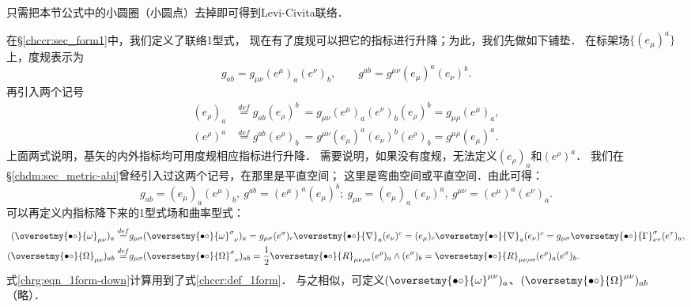只需把本节公式中的小圆圈（小圆点）去掉即可得到Levi-Civita联络．



在\S\ref{chccr:sec_form1}中，我们定义了联络1型式，
现在有了度规可以把它的指标进行升降；为此，我们先做如下铺垫．
在标架场$\{(e_\mu)^a\}$上，度规表示为
\begin{equation}
	g_{ab}=g_{\mu\nu}(e^\mu)_a (e^\nu)_b, \qquad
	g^{ab}=g^{\mu\nu}(e_\mu)^a (e_\nu)^b.
\end{equation}
再引入两个记号
\begin{align}
	(e_\rho)_a &\overset{def}{=} g_{ab}(e_\rho)^b \
	= g_{\mu\nu}(e^\mu)_a (e^\nu)_b (e_\rho)^b
	= g_{\mu\rho}(e^\mu)_a, \\
	(e^\rho)^a &\overset{def}{=} g^{ab}(e^\rho)_b \
	= g^{\mu\nu}(e_\mu)^a (e_\nu)^b(e^\rho)_b
	= g^{\mu\rho}(e_\mu)^a .
\end{align}
上面两式说明，基矢的内外指标均可用度规相应指标进行升降．
需要说明，如果没有度规，无法定义$(e_\rho)_a$和$(e^\rho)^a$．
我们在\S\ref{chdm:sec_metric-abi}曾经引入过这两个记号，在那里是平直空间；
这里是弯曲空间或平直空间．由此可得：
\begin{equation}
	g_{ab}=(e_\mu)_a (e^\mu)_b, \  g^{ab}=(e^\mu)^a (e_\mu)^b ; \
	g_{\mu\nu}=(e_\mu)_a (e_\nu)^a, \  g^{\mu\nu}=(e^\mu)^a (e^\nu)_a .
\end{equation}
可以再定义内指标降下来的1型式场和曲率型式：
\begin{align}
	(\oversetmy{\bullet\circ}{\omega} _{\mu\nu})_{a} \overset{def}{=}&
	g_{\mu\sigma} (\oversetmy{\bullet\circ}{\omega}^{\sigma}_{\hphantom{\sigma}\nu})_{a}
	= g_{\mu\sigma} (e^\sigma)_c \oversetmy{\bullet\circ}{\nabla}_a (e_\nu)^c
	= (e_\mu)_c \oversetmy{\bullet\circ}{\nabla}_a (e_\nu)^c
	= g_{\mu\sigma}\oversetmy{\bullet\circ}{\Gamma}^{\sigma}_{\nu\tau} (e^\tau)_a , \label{chrg:eqn_1form-down}\\
	(\oversetmy{\bullet\circ}{\Omega}_{\mu\nu} )_{ab} \overset{def}{=}& 
	g_{\mu\sigma}(\oversetmy{\bullet\circ}{\Omega}_{\hphantom{\sigma} \nu} ^{\sigma})_{ab}
	= \frac{1}{2} \oversetmy{\bullet\circ}{R}_{\mu \nu \rho\sigma}  (e^\rho)_a \wedge (e^\sigma)_b
	= \oversetmy{\bullet\circ}{R}_{\mu \nu \rho\sigma} (e^\rho)_a (e^\sigma)_b . \label{chrg:eqn_Cform-down}
\end{align}
式\eqref{chrg:eqn_1form-down}计算用到了式\eqref{chccr:def_1form}．
与之相似，可定义$(\oversetmy{\bullet\circ}{\omega} ^{\mu\nu})_{a}$、$(\oversetmy{\bullet\circ}{\Omega}^{\mu\nu} )_{ab}$（略）．




